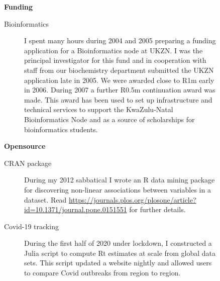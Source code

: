           
 \begin{description}\item[] \begin{description}\item[] {\large \bf  Funding }
\begin{description}
 \item[ Bioinformatics     ]  
          I spent many hours during 2004 and 2005 preparing
          a funding application for a
          Bioinformatics node at UKZN. 
          I was the principal investigator
          for this fund and in cooperation
          with staff from our biochemistry department
          submitted the UKZN application
          late in 2005.
          We were awarded close to R1m early in 2006.
          During 2007 a further R0.5m continuation award was made.
          This award has been used to set up infrastructure and technical
          services to support the KwaZulu-Natal Bioinformatics Node and
          as a source of scholarships for bioinformatics students.
          
\end{description}
\end{description}
\end{description}
          
\begin{description}\item[] \begin{description}\item[] {\large \bf  Opensource }
\begin{description}
\item[ CRAN package ]
	During my 2012 sabbatical I wrote an R data mining package for discovering
	non-linear associations between variables in a dataset. Read 
	\url{https://journals.plos.org/plosone/article?id=10.1371/journal.pone.0151551}       
	for further details.
\item[ Covid-19 tracking ]
	During the first half of 2020 under lockdown, I constructed a Julia script
	to compute Rt estimates at scale from global data sets. This script updated
	a website nightly and allowed users to compare Covid outbreaks from region to region.
\end{description}
\end{description}
\end{description}

